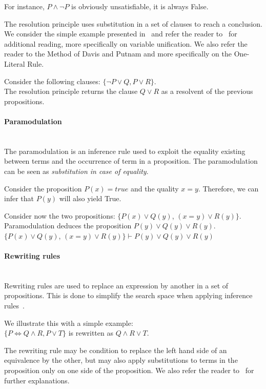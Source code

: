 For instance, $P \wedge \neg P$ is obviously unsatisfiable, \ie it is always False.

The resolution principle uses substitution in a set of clauses to reach a conclusion.
We consider the simple example presented in~\cite{snark-Stickel2000} and refer the reader to~\cite{symbolic-proof} for additional reading, more specifically on variable unification.
We also refer the reader to the Method of Davis and Putnam and more specifically on the One-Literal Rule.

Consider the following clauses: $\{\neg P \vee Q,P \vee R\}$.\\
The resolution principle returns the clause $Q \vee R$ as a resolvent of the previous propositions.


\paragraph{Paramodulation}\textbf{\\}
The paramodulation is an inference rule used to exploit the equality existing between terms and the occurrence of term in a proposition. The paramodulation can be seen as \textit{substitution in case of equality}.

Consider the proposition $P(x) = true$ and the quality $x=y$. Therefore, we can infer that $P(y)$ will also yield True.

Consider now the two propositions: $\{P(x) \vee Q(y)$, $(x = y) \vee R(y)\}$.\\
Paramodulation deduces the proposition $P(y) \vee Q(y) \vee R(y)$.\\
$\{P(x) \vee Q(y)$, $(x = y) \vee R(y)\} \vdash P(y) \vee Q(y) \vee R(y)$

\paragraph{Rewriting rules}\textbf{\\}
Rewriting rules are used to replace an expression by another in a set of propositions.
This is done to simplify the search space when applying inference rules~\cite{snark-Stickel2000}.

We illustrate this with a simple example:\\
$\{P \Leftrightarrow Q \wedge R, P \vee T\}$ is rewritten as $Q \wedge R \vee T$. 

The rewriting rule may be condition to replace the left hand side of an equivalence by the other, but may also apply substitutions to terms in the proposition only on one side of the proposition.
We also refer the reader to~\cite{snark-Stickel2000,symbolic-proof} for further explanations.
